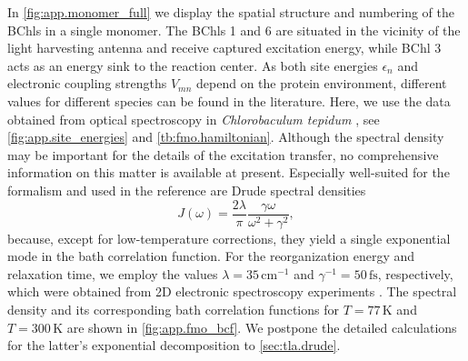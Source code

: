 In \autoref{fig:app.monomer_full} we display the spatial structure and numbering of the BChls in a single monomer.
The BChls 1 and 6 are situated in the vicinity of the light harvesting antenna and receive captured excitation energy, while BChl 3 acts as an energy sink to the reaction center.
As both site energies $\epsilon_n$ and electronic coupling strengths $V_{mn}$ depend on the protein environment, different values for different species can be found in the literature.
Here, we use the data obtained from optical spectroscopy in \emph{Chlorobaculum tepidum} \cite{AdRe06_fmo}, see \autoref{fig:app.site_energies} and \autoref{tb:fmo.hamiltonian}.
Although the spectral density may be important for the details of the excitation transfer, no comprehensive information on this matter is available at present.
Especially well-suited for the \HEOM formalism and used in the reference \cite{IsFl09_fmo} are Drude spectral densities
\begin{equation}
  J(\omega) = \frac{2 \lambda}{\pi} \frac{\gamma\omega}{\omega^2 + \gamma^2},
  \label{eq:app.drude}
\end{equation}
because, except for low-temperature corrections, they yield a single exponential mode in the bath correlation function.
For the reorganization energy and relaxation time, we employ the values $\lambda = 35\,\mathrm{cm^{-1}}$ and $\gamma^{-1} = 50\,\mathrm{fs}$, respectively, which were obtained from 2D electronic spectroscopy experiments \cite{ReScEn08_fmo_spectral_density}.
The spectral density and its corresponding bath correlation functions for $T=77\,\mathrm{K}$ and $T=300\,\mathrm{K}$ are shown in \autoref{fig:app.fmo_bcf}.
We postpone the detailed calculations for the latter's exponential decomposition to \autoref{sec:tla.drude}.\\




